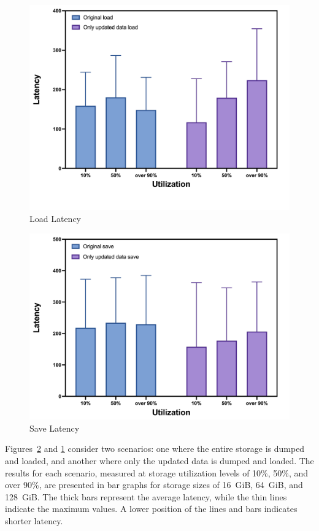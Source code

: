\begin{figure}[t]
    \centering
	\includegraphics[width=0.95\columnwidth]{graphs/load_latency}
	\caption{Load Latency}
	\label{f:load_latency}
\end{figure}

\begin{figure}[t]
    \centering
	\includegraphics[width=0.95\columnwidth]{graphs/save_latency}
	\caption{Save Latency}
	\label{f:save_latency}
\end{figure}

Figures~\ref{f:save_latency} and \ref{f:load_latency} consider two scenarios: one where the entire storage is dumped and loaded, and another where only the updated data is dumped and loaded.
The results for each scenario, measured at storage utilization levels of 10\%, 50\%, and over 90\%, are presented in bar graphs for storage sizes of 16~GiB, 64~GiB, and 128~GiB.
The thick bars represent the average latency, while the thin lines indicate the maximum values.
A lower position of the lines and bars indicates shorter latency.

